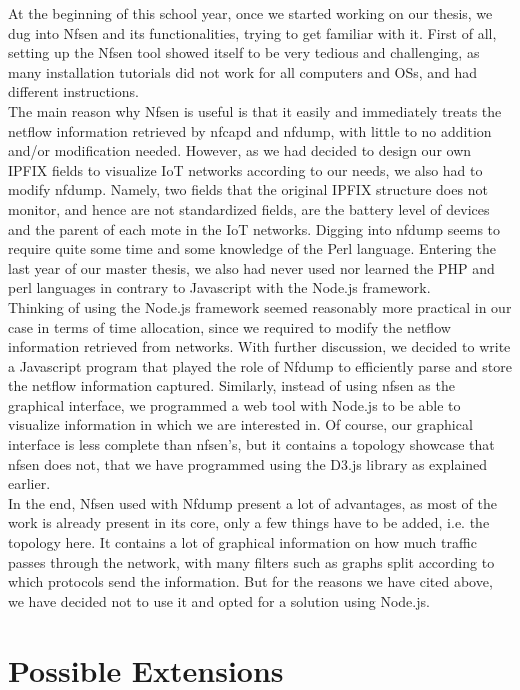 At the beginning of this school year, once we started working on our thesis, we dug into Nfsen and its functionalities, trying to get familiar with it. First of all, setting up the Nfsen tool showed itself to be very tedious and challenging, as many installation tutorials did not work for all computers and OSs, and had different instructions.\\

The main reason why Nfsen is useful is that it easily and immediately treats the netflow information retrieved by nfcapd and nfdump, with little to no addition and/or modification needed. However, as we had decided to design our own IPFIX fields to visualize IoT networks according to our needs, we also had to modify nfdump. Namely, two fields that the original IPFIX structure does not monitor, and hence are not standardized fields, are the battery level of devices and the parent of each mote in the IoT networks. Digging into nfdump seems to require quite some time and some knowledge of the Perl language. Entering the last year of our master thesis, we also had never used nor learned the PHP and perl languages in contrary to Javascript with the Node.js framework. \\

Thinking of using the Node.js framework seemed reasonably more practical in our case in terms of time allocation, since we required to modify the netflow information retrieved from networks. With further discussion, we decided to write a Javascript program that played the role of Nfdump to efficiently parse and store the netflow information captured. Similarly, instead of using nfsen as the graphical interface, we programmed a web tool with Node.js to be able to visualize information in which we are interested in. Of course, our graphical interface is less complete than nfsen's, but it contains a topology showcase that nfsen does not, that we have programmed using the D3.js library as explained earlier.\\

In the end, Nfsen used with Nfdump present a lot of advantages, as most of the work is already present in its core, only a few things have to be added, i.e. the topology here. It contains a lot of graphical information on how much traffic passes through the network, with many filters such as graphs split according to which protocols send the information. But for the reasons we have cited above, we have decided not to use it and opted for a solution using Node.js.

\section{Possible Extensions}

